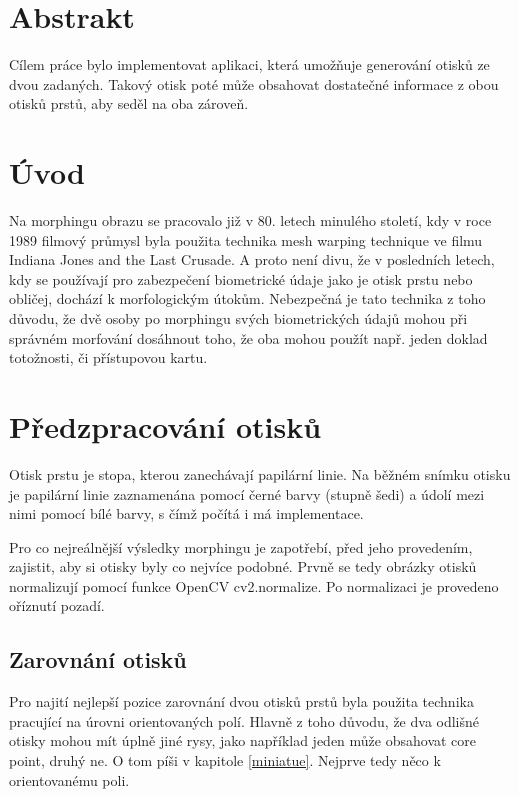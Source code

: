\documentclass[a4paper,11pt]{article}
\begin{document}
\newpage
\begin{multicols*}{2}
\section{Abstrakt}
    Cílem práce bylo implementovat aplikaci, která umožňuje generování otisků ze dvou zadaných. Takový otisk poté může obsahovat dostatečné informace z obou otisků prstů, aby seděl na oba zároveň.

\section{Úvod}
    Na morphingu obrazu se pracovalo již v 80. letech minulého století, kdy v roce 1989 filmový průmysl byla použita technika mesh warping technique ve filmu Indiana Jones and the Last Crusade. A proto není divu, že v posledních letech, kdy se používají pro zabezpečení biometrické údaje jako je otisk prstu nebo obličej, dochází k morfologickým útokům. Nebezpečná je tato technika z toho důvodu, že dvě osoby po morphingu svých biometrických údajů mohou při správném morfování dosáhnout toho, že oba mohou použít např. jeden doklad totožnosti, či přístupovou kartu. 

\section{Předzpracování otisků} 
    Otisk prstu je stopa, kterou zanechávají papilární linie. Na běžném snímku otisku je papilární linie zaznamenána pomocí černé barvy (stupně šedi) a údolí mezi nimi pomocí bílé barvy, s čímž počítá i má implementace.
    
    Pro co nejreálnější výsledky morphingu je zapotřebí, před jeho provedením, zajistit, aby si otisky byly co nejvíce podobné. Prvně se tedy obrázky otisků normalizují pomocí funkce OpenCV cv2.normalize. Po normalizaci je provedeno oříznutí pozadí. 
    
    \subsection{Zarovnání otisků}
        Pro najití nejlepší pozice zarovnání dvou otisků prstů byla použita technika pracující na úrovni orientovaných polí. Hlavně z toho důvodu, že dva odlišné otisky mohou mít úplně jiné rysy, jako například jeden může obsahovat core point, druhý ne. O tom píši v kapitole \ref{miniatue}. Nejprve tedy něco k orientovanému poli.


\end{multicols*}
\end{document}
